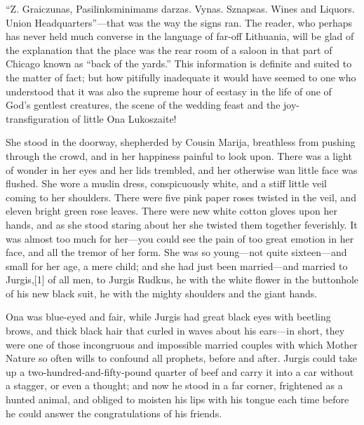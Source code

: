 \documentclass[
]{book}
\begin{document}
``Z. Graiczunas, Pasilinksminimams darzas. Vynas. Sznapsas. Wines and Liquors. Union Headquarters''---that was the way the signs ran. The reader, who perhaps has never held much converse in the language of far-off Lithuania, will be glad of the explanation that the place was the rear room of a saloon in that part of Chicago known as ``back of the yards.'' This information is definite and suited to the matter of fact; but how pitifully inadequate it would have seemed to one who understood that it was also the supreme hour of ecstasy in the life of one of God's gentlest creatures, the scene of the wedding feast and the joy-transfiguration of little Ona Lukoszaite!

She stood in the doorway, shepherded by Cousin Marija, breathless from pushing through the crowd, and in her happiness painful to look upon. There was a light of wonder in her eyes and her lids trembled, and her otherwise wan little face was flushed. She wore a muslin dress, conspicuously white, and a stiff little veil coming to her shoulders. There were five pink paper roses twisted in the veil, and eleven bright green rose leaves. There were new white cotton gloves upon her hands, and as she stood staring about her she twisted them together feverishly. It was almost too much for her---you could see the pain of too great emotion in her face, and all the tremor of her form. She was so young---not quite sixteen---and small for her age, a mere child; and she had just been married---and married to Jurgis,{[}1{]} of all men, to Jurgis Rudkus, he with the white flower in the buttonhole of his new black suit, he with the mighty shoulders and the giant hands.

Ona was blue-eyed and fair, while Jurgis had great black eyes with beetling brows, and thick black hair that curled in waves about his ears---in short, they were one of those incongruous and impossible married couples with which Mother Nature so often wills to confound all prophets, before and after. Jurgis could take up a two-hundred-and-fifty-pound quarter of beef and carry it into a car without a stagger, or even a thought; and now he stood in a far corner, frightened as a hunted animal, and obliged to moisten his lips with his tongue each time before he could answer the congratulations of his friends.
\end{document}

